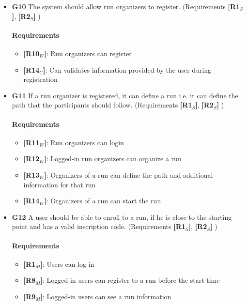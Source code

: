 \begin{itemize}
\begin{itemize}
   \end{itemize}
   
   
    \item \textbf{G10} The system should allow run organizers to register. (Requirements \textbf{[R1$_S$]}, \textbf{[R2$_S$]} )
    
    \paragraph{Requirements}
   \begin{itemize}
    \item \textbf{[R10$_W$]}: Run organizers can register
    \item \textbf{[R14$_C$]}: Can validates information provided by the user during registration
   \end{itemize}
    
    
    \item \textbf{G11} If a run organizer is registered, it can define a run i.e. it can define the path that the participants should follow. (Requirements \textbf{[R1$_S$]}, \textbf{[R2$_S$]} )
    
    \paragraph{Requirements}
   \begin{itemize}
    \item \textbf{[R11$_W$]}: Run organizers can login
    \item \textbf{[R12$_W$]}: Logged-in run organizers can organize a run
    \item \textbf{[R13$_W$]}: Organizers of a run can define the path and additional information for that run
    \item \textbf{[R14$_W$]}: Organizers of a run can start the run
   \end{itemize}
   
   
    \item \textbf{G12} A user should be able to enroll to a run, if he is close to the starting point and has a valid inscription code. (Requirements \textbf{[R1$_S$]}, \textbf{[R2$_S$]} )
    
    \paragraph{Requirements}
   \begin{itemize}
    \item \textbf{[R1$_M$]}: Users can log-in
    \item \textbf{[R8$_M$]}: Logged-in users can register to a run before the start time
    \item \textbf{[R9$_M$]}: Logged-in users can see a run information
   \end{itemize}


\end{itemize}
